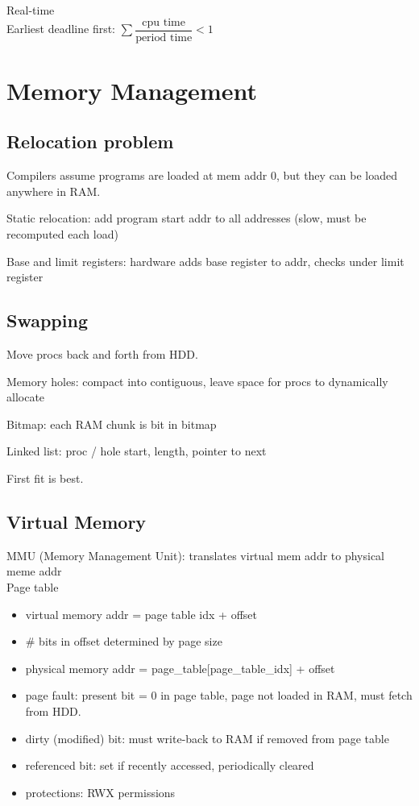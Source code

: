 \documentclass[10pt]{article}
\begin{document}
Real-time\\
Earliest deadline first: $\sum \dfrac{\text{cpu time}}{\text{period time}} < 1$

\section{Memory Management}
\subsection{Relocation problem}
Compilers assume programs are loaded at mem addr 0, but they can be loaded anywhere in RAM.

Static relocation: add program start addr to all addresses (slow, must be recomputed each load)

Base and limit registers: hardware adds base register to addr, checks under limit register

\subsection{Swapping}
Move procs back and forth from HDD.

Memory holes: compact into contiguous, leave space for procs to dynamically allocate

Bitmap: each RAM chunk is bit in bitmap

Linked list: proc / hole start, length, pointer to next

First fit is best.

\subsection{Virtual Memory}
MMU (Memory Management Unit): translates virtual mem addr to physical meme addr\\

Page table
\begin{itemize}
    \item virtual memory addr = page table idx + offset
    \item \# bits in offset determined by page size
    \item physical memory addr = page\_table[page\_table\_idx] + offset
    \item page fault: present bit = 0 in page table, page not loaded in RAM, must fetch from HDD.
    \item dirty (modified) bit: must write-back to RAM if removed from page table
    \item referenced bit: set if recently accessed, periodically cleared
    \item protections: RWX permissions
\end{itemize}
\end{document}
